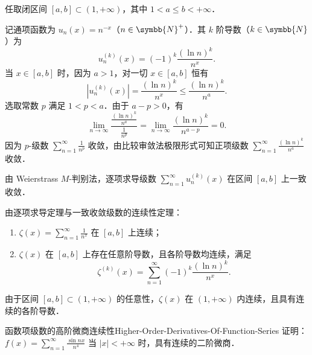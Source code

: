 \begin{myproof}
    任取闭区间 $[a, b] \subset (1, +\infty)$，其中 $1 < a \leqslant b < +\infty$．

    记通项函数为 $u_n(x) = n^{-x}$（$n \in \symbb{N}^+$）．其 $k$ 阶导数（$k \in \symbb{N}$）为
    \begin{equation}
        u_n^{(k)}(x) = (-1)^k \frac{(\ln n)^k}{n^x}.
    \end{equation}
    当 $x \in [a, b]$ 时，因为 $a > 1$，对一切 $x \in [a, b]$ 恒有
    \begin{equation}
        |u_n^{(k)}(x)| = \frac{(\ln n)^k}{n^x} \leqslant \frac{(\ln n)^k}{n^a}.
    \end{equation}
    选取常数 $p$ 满足 $1 < p < a$．由于 $a - p > 0$，有
    \begin{equation}
        \lim_{n\to\infty} \frac{\frac{(\ln n)^k}{n^a}}{\frac{1}{n^p}} = \lim_{n\to\infty} \frac{(\ln n)^k}{n^{a - p}} = 0.
    \end{equation}
    因为 $p$-级数 $\sum_{n=1}^\infty \frac{1}{n^p}$ 收敛，由比较审敛法极限形式可知正项级数 $\sum_{n=1}^\infty \frac{(\ln n)^k}{n^a}$ 收敛．

    由 Weierstrass $M$-判别法，逐项求导级数 $\sum_{n=1}^\infty u_n^{(k)}(x)$ 在区间 $[a, b]$ 上一致收敛．

    由逐项求导定理与一致收敛级数的连续性定理：
    \begin{enumerate}
        \item $\zeta(x) = \sum_{n=1}^\infty \frac{1}{n^x}$ 在 $[a, b]$ 上连续；
        \item $\zeta(x)$ 在 $[a, b]$ 上存在任意阶导数，且各阶导数均连续，满足
              \begin{equation}
                  \zeta^{(k)}(x) = \sum_{n=1}^\infty (-1)^k \frac{(\ln n)^k}{n^x}.
              \end{equation}
    \end{enumerate}
    由于区间 $[a, b] \subset (1, +\infty)$ 的任意性，$\zeta(x)$ 在 $(1, +\infty)$ 内连续，且具有连续的各阶导数．
\end{myproof}

\begin{problem}{函数项级数的高阶微商连续性}{Higher-Order-Derivatives-Of-Function-Series}
    证明：$f(x) = \sum_{n=1}^\infty \frac{\sin nx}{n^4}$ 当 $|x| < +\infty$ 时，具有连续的二阶微商．
\end{problem}

